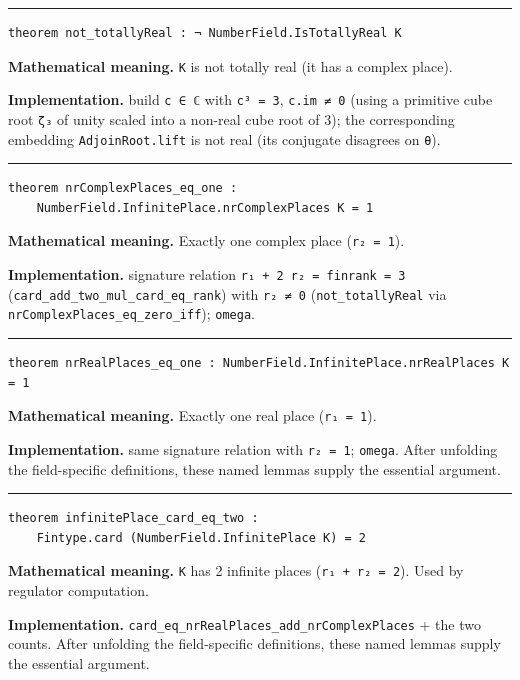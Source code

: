 \documentclass[UTF8,a4paper,11pt,fontset=fandol]{ctexart}
\theoremstyle{definition}
\newcommand{\statementsep}{\par\medskip\hrule\medskip}
\begin{document}
\statementsep
\begin{verbatim}
theorem not_totallyReal : ¬ NumberField.IsTotallyReal K
\end{verbatim}
\noindent\textbf{Mathematical meaning.} \texttt{K} is not totally real (it has a complex place).\par
\noindent\textbf{Implementation.} build \texttt{c ∈ ℂ} with \texttt{c³ = 3}, \texttt{c.\allowbreak{}im ≠ 0} (using a primitive cube root \texttt{ζ₃} of unity scaled into a non-real cube root of 3); the corresponding embedding \texttt{AdjoinRoot.\allowbreak{}lift} is not real (its conjugate disagrees on \texttt{θ}).\par
\statementsep
\begin{verbatim}
theorem nrComplexPlaces_eq_one :
    NumberField.InfinitePlace.nrComplexPlaces K = 1
\end{verbatim}
\noindent\textbf{Mathematical meaning.} Exactly one complex place (\texttt{r₂ = 1}).\par
\noindent\textbf{Implementation.} signature relation \texttt{r₁ + 2 r₂ = finrank = 3} (\texttt{card\_\allowbreak{}add\_\allowbreak{}two\_\allowbreak{}mul\_\allowbreak{}card\_\allowbreak{}eq\_\allowbreak{}rank}) with \texttt{r₂ ≠ 0} (\texttt{not\_\allowbreak{}totallyReal} via \texttt{nrComplexPlaces\_\allowbreak{}eq\_\allowbreak{}zero\_\allowbreak{}iff}); \texttt{omega}.\par
\statementsep
\begin{verbatim}
theorem nrRealPlaces_eq_one : NumberField.InfinitePlace.nrRealPlaces K = 1
\end{verbatim}
\noindent\textbf{Mathematical meaning.} Exactly one real place (\texttt{r₁ = 1}).\par
\noindent\textbf{Implementation.} same signature relation with \texttt{r₂ = 1}; \texttt{omega}. After unfolding the field-specific definitions, these named lemmas supply the essential argument.\par
\statementsep
\begin{verbatim}
theorem infinitePlace_card_eq_two :
    Fintype.card (NumberField.InfinitePlace K) = 2
\end{verbatim}
\noindent\textbf{Mathematical meaning.} \texttt{K} has 2 infinite places (\texttt{r₁ + r₂ = 2}). Used by regulator computation.\par
\noindent\textbf{Implementation.} \texttt{card\_\allowbreak{}eq\_\allowbreak{}nrRealPlaces\_\allowbreak{}add\_\allowbreak{}nrComplexPlaces} + the two counts. After unfolding the field-specific definitions, these named lemmas supply the essential argument.\par
\end{document}
